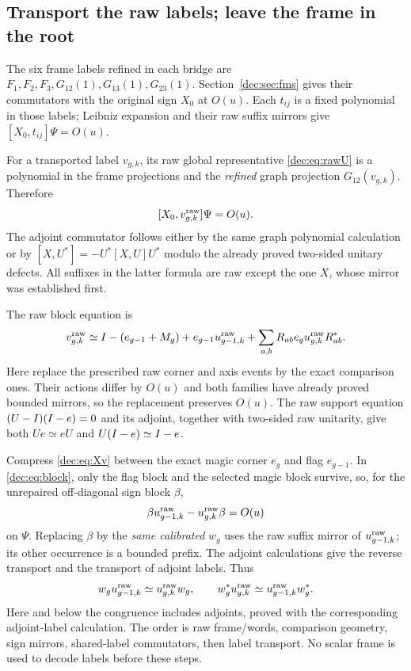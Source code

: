 \subsection{Transport the raw labels; leave the frame in the root}\label{dec:sec:labels}
The six frame labels refined in each bridge are $F_1,F_2,F_3,G_{12}(1),G_{13}(1),G_{23}(1)$. Section~\ref{dec:sec:fms} gives their commutators with the original sign $X_0$ at $O(u)$. Each $t_{ij}$ is a fixed polynomial in those labels; Leibniz expansion and their raw suffix mirrors give $[X_0,t_{ij}]\Psi=O(u)$.

For a transported label $v_{g,k}$, its raw global representative \eqref{dec:eq:rawU} is a polynomial in the frame projections and the \emph{refined} graph projection $G_{12}(v_{g,k})$. Therefore
\begin{equation}\label{dec:eq:Xv}
[X_0,v_{g,k}^{\mathrm{raw}}]\Psi=O(u).
\end{equation}
The adjoint commutator follows either by the same graph polynomial calculation or by
$[X,U^*]=-U^*[X,U]U^*$ modulo the already proved two-sided unitary defects. All suffixes in the latter formula are raw except the one $X$, whose mirror was established first.

The raw block equation is
\begin{equation}\label{dec:eq:block}
v_{g,k}^{\mathrm{raw}}\simeq I-(e_{g-1}+M_g)+e_{g-1}u_{g-1,k}^{\mathrm{raw}}
+\sum_{a,b}R_{ab}e_gu_{g,k}^{\mathrm{raw}}R_{ab}^*.
\end{equation}
Here replace the prescribed raw corner and axis events by the exact comparison ones. Their actions differ by $O(u)$ and both families have already proved bounded mirrors, so the replacement preserves $O(u)$. The raw support equation $(U-I)(I-e)=0$ and its adjoint, together with two-sided raw unitarity, give both $Ue\simeq eU$ and $U(I-e)\simeq I-e$.

Compress \eqref{dec:eq:Xv} between the exact magic corner $e_g$ and flag $e_{g-1}$. In \eqref{dec:eq:block}, only the flag block and the selected magic block survive, so, for the unrepaired off-diagonal sign block $\beta$,
\[
\beta u_{g-1,k}^{\mathrm{raw}}-u_{g,k}^{\mathrm{raw}}\beta=O(u)
\]
on $\Psi$. Replacing $\beta$ by the \emph{same calibrated} $w_g$ uses the raw suffix mirror of $u_{g-1,k}^{\mathrm{raw}}$; its other occurrence is a bounded prefix. The adjoint calculations give the reverse transport and the transport of adjoint labels. Thus
\begin{equation}\label{dec:eq:transport}
w_gu_{g-1,k}^{\mathrm{raw}}\simeq u_{g,k}^{\mathrm{raw}}w_g,
\qquad
w_g^*u_{g,k}^{\mathrm{raw}}\simeq u_{g-1,k}^{\mathrm{raw}}w_g^*.
\end{equation}
Here and below the congruence includes adjoints, proved with the corresponding adjoint-label calculation. The order is raw frame/words, comparison geometry, sign mirrors, shared-label commutators, then label transport. No scalar frame is used to decode labels before these steps.

